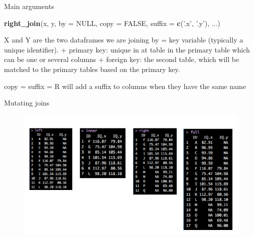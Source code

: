 \documentclass[ignorenonframetext,]{beamer}
\newenvironment{Shaded}{\begin{snugshade}}{\end{snugshade}}
\newcommand{\KeywordTok}[1]{\textcolor[rgb]{0.13,0.29,0.53}{\textbf{#1}}}
\newcommand{\DataTypeTok}[1]{\textcolor[rgb]{0.13,0.29,0.53}{#1}}
\newcommand{\StringTok}[1]{\textcolor[rgb]{0.31,0.60,0.02}{#1}}
\newcommand{\OtherTok}[1]{\textcolor[rgb]{0.56,0.35,0.01}{#1}}
\newcommand{\NormalTok}[1]{#1}
\begin{document}
\begin{frame}[fragile]{Main arguments}

\begin{Shaded}
\begin{Highlighting}[]
\KeywordTok{right_join}\NormalTok{(x, y, }\DataTypeTok{by =} \OtherTok{NULL}\NormalTok{, }\DataTypeTok{copy =} \OtherTok{FALSE}\NormalTok{, }\DataTypeTok{suffix =} \KeywordTok{c}\NormalTok{(}\StringTok{'.x'}\NormalTok{, }\StringTok{'.y'}\NormalTok{), ...)}
\end{Highlighting}
\end{Shaded}

X and Y are the two dataframes we are joining by = key variable
(typically a unique identifier). + primary key: unique in at table in
the primary table which can be one or several columns + foreign key: the
second table, which will be matched to the primary tables based on the
primary key.

copy = suffix = R will add a suffix to columns when they have the same
name

\end{frame}

\begin{frame}{Mutating joins}

\begin{figure}
\centering
\includegraphics{graphs/mutate.png}
\caption{}
\end{figure}

\end{frame}
\end{document}
